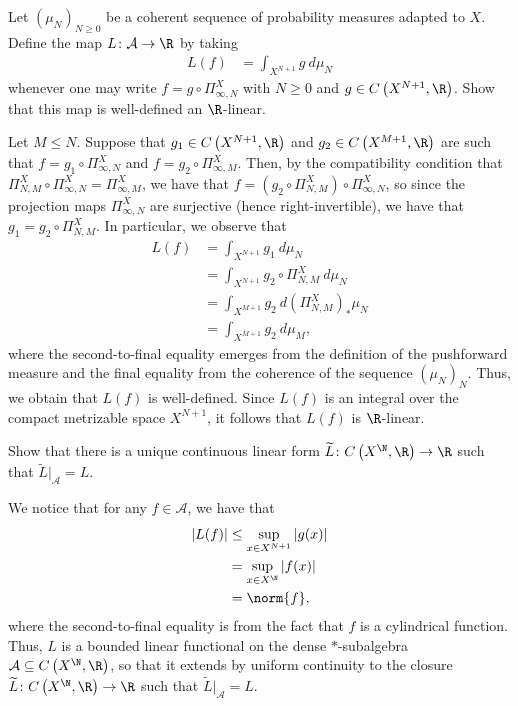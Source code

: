 \documentclass[10pt]{mypackage}
\begin{document}
\begin{problem}[Problem IV.7]
  Let $\left( \mu_N \right)_{N\geq 0}$ be a coherent sequence of probability measures adapted to $X$. Define the map $L\colon \mathcal{A}\to \R$ by taking
  \begin{align*}
    L\left( f \right) &= \int_{X^{N+1}}^{} g\:d\mu_N
  \end{align*}
  whenever one may write $f = g\circ \Pi_{\infty,N}^{X}$ with $N\geq 0$ and $g\in C\left( X^{N+1},\R \right)$. Show that this map is well-defined an $\R$-linear.
\end{problem}
\begin{solution}
  Let $M\leq N$. Suppose that $g_1\in C\left( X^{N+1},\R \right)$ and $g_2\in C\left( X^{M+1},\R \right)$ are such that $f = g_1\circ \Pi^{X}_{\infty,N}$ and $f = g_2\circ \Pi^{X}_{\infty,M}$. Then, by the compatibility condition that $\Pi^{X}_{N,M}\circ \Pi^{X}_{\infty,N} = \Pi^{X}_{\infty,M}$, we have that $f = \left( g_2\circ \Pi^{X}_{N,M} \right)\circ \Pi^{X}_{\infty,N}$, so since the projection maps $\Pi^{X}_{\infty,N}$ are surjective (hence right-invertible), we have that $g_1 = g_2\circ \Pi^{X}_{N,M}$. In particular, we observe that
  \begin{align*}
    L(f) &= \int_{X^{N+1}}^{} g_1\:d\mu_N\\
         &= \int_{X^{N+1}}^{} g_2\circ \Pi^{X}_{N,M}\:d\mu_N\\
         &= \int_{X^{M+1}}^{} g_2\:d\left( \Pi^{X}_{N,M} \right)_{\ast}\mu_N\\
         &= \int_{X^{M+1}}^{} g_2\:d\mu_M,
  \end{align*}
  where the second-to-final equality emerges from the definition of the pushforward measure and the final equality from the coherence of the sequence $\left( \mu_N \right)_N$. Thus, we obtain that $L(f)$ is well-defined. Since $L(f)$ is an integral over the compact metrizable space $X^{N+1}$, it follows that $L(f)$ is $\R$-linear.
\end{solution}
\begin{problem}[Problem IV.8]
  Show that there is a unique continuous linear form $ \widetilde{L}\colon C\left( X^{\N},\R \right)\to \R $ such that $ \widetilde{L}|_{\mathcal{A}} = L $.
\end{problem}
\begin{solution}
  We notice that for any $f\in \mathcal{A}$, we have that
  \begin{align*}
    \left\vert L(f) \right\vert &\leq \sup_{x\in X^{N+1}}\left\vert g(x) \right\vert\\
                                &= \sup_{x\in X^{\N}} \left\vert f(x) \right\vert\\
                                &= \norm{f},
  \end{align*}
  where the second-to-final equality is from the fact that $f$ is a cylindrical function. Thus, $L$ is a bounded linear functional on the dense $\ast$-subalgebra $\mathcal{A}\subseteq C\left( X^{\N},\R \right)$, so that it extends by uniform continuity to the closure $ \widetilde{L}\colon C\left( X^{\N},\R \right)\to \R $ such that $ \widetilde{L}|_{\mathcal{A}} = L $.
\end{solution}
\end{document}
